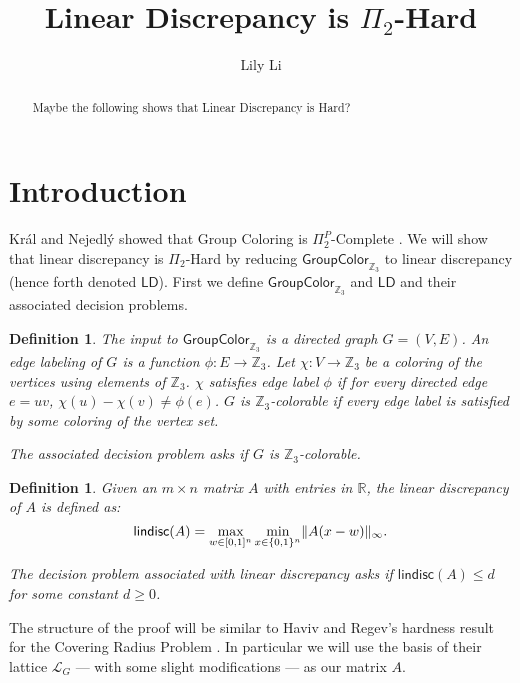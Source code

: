 \documentclass{article}
\title{Linear Discrepancy is $\Pi_2$-Hard}
\author{Lily Li}
\newtheorem{definition}[theorem]{Definition}
\DeclarePairedDelimiter\norm{\parallel}{\parallel}
\newcommand\SetL{\mathcal{L}}
\newcommand\R{\mathbb{R}}
\newcommand\Z{\mathbb{Z}}
\newcommand\lindisc{\mathsf{lindisc}}
\newcommand\LD{\mathsf{LD}}
\newcommand\GroupColor{\mathsf{GroupColor}}
\begin{document}
\thispagestyle{empty}
\maketitle

\begin{abstract}
Maybe the following shows that Linear Discrepancy is Hard?
\end{abstract}

\section{Introduction}

Kr\'{a}l and Nejedl\'{y} showed that Group Coloring is $\Pi_2^P$-Complete \cite{nejedly2004group}. We will show that linear discrepancy is $\Pi_2$-Hard by reducing $\GroupColor_{\Z_3}$ to linear discrepancy (hence forth denoted $\LD$). First we define $\GroupColor_{\Z_3}$ and $\LD$ and their associated decision problems.  

\begin{definition}
The input to $\GroupColor_{\Z_3}$ is a directed graph $G = (V, E)$. An \emph{edge labeling} of $G$ is a function $\phi: E \rightarrow \Z_3$. Let $\chi: V \rightarrow \Z_3$ be a coloring of the vertices using elements of $\Z_3$. $\chi$ \emph{satisfies} edge label $\phi$ if for every directed edge $e = uv$, $\chi(u) - \chi(v) \neq \phi(e)$. $G$ is \emph{$\Z_3$-colorable} if every edge label is satisfied by some coloring of the vertex set.

The associated decision problem asks if $G$ is $\Z_3$-colorable.   
\end{definition}

\begin{definition}
Given an $m \times n$ matrix $A$ with entries in $\R$, the linear discrepancy of $A$ is defined as:
\[\lindisc(A) = \max_{w \in [0,1]^n}\min_{x \in \{0,1\}^n} \norm{A(x-w)}_\infty.\]

The decision problem associated with linear discrepancy asks if $\lindisc(A) \leq d$ for some constant $d \geq 0$.
\end{definition}

The structure of the proof will be similar to Haviv and Regev's hardness result for the Covering Radius Problem \cite{haviv2006hardness}. In particular we will use the basis of their lattice $\SetL_G$ --- with some slight modifications --- as our matrix $A$.
\end{document}
